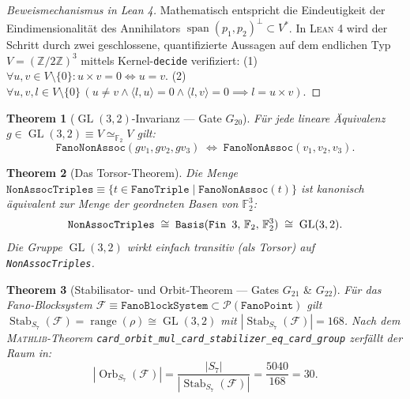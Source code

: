 \documentclass[11pt,a4paper]{article}
\newtheorem{theorem}{Theorem}[section]
\theoremstyle{remark}
\begin{document}
	\begin{proof}[Beweismechanismus in Lean 4]
		Mathematisch entspricht die Eindeutigkeit der Eindimensionalität des Annihilators $\operatorname{span}(p_1, p_2)^\perp \subset V^*$. In \textsc{Lean 4} wird der Schritt durch zwei geschlossene, quantifizierte Aussagen auf dem endlichen Typ $V = (\mathbb{Z}/2\mathbb{Z})^3$ mittels Kernel-\texttt{decide} verifiziert:
		(1) $\forall u, v \in V \setminus \{0\}: u \times v = 0 \iff u = v$.
		(2) $\forall u, v, l \in V \setminus \{0\} \, (u \neq v \land \langle l, u \rangle = 0 \land \langle l, v \rangle = 0 \implies l = u \times v)$.
	\end{proof}
	
	\begin{theorem}[$\operatorname{GL}(3,2)$-Invarianz --- Gate $G_{20}$]
		Für jede lineare Äquivalenz $g \in \operatorname{GL}(3,2) \equiv V \simeq_{\mathbb{F}_2} V$ gilt:
		\begin{equation}
			\texttt{FanoNonAssoc}(g v_1, g v_2, g v_3) \;\Longleftrightarrow\; \texttt{FanoNonAssoc}(v_1, v_2, v_3).
		\end{equation}
	\end{theorem}
	
	\begin{theorem}[Das Torsor-Theorem]
		Die Menge $\texttt{NonAssocTriples} \equiv \{t \in \texttt{FanoTriple} \mid \texttt{FanoNonAssoc}(t)\}$ ist kanonisch äquivalent zur Menge der geordneten Basen von $\mathbb{F}_2^3$:
		\begin{equation}
			\texttt{NonAssocTriples} \;\cong\; \text{\texttt{Basis}}(\text{\texttt{Fin }} 3, \, \mathbb{F}_2, \, \mathbb{F}_2^3) \;\cong\; \operatorname{GL}(3,2).
		\end{equation}
		Die Gruppe $\operatorname{GL}(3,2)$ wirkt einfach transitiv (als Torsor) auf \texttt{NonAssocTriples}.
	\end{theorem}
	
	\begin{theorem}[Stabilisator- und Orbit-Theorem --- Gates $G_{21}$ \& $G_{22}$]
		Für das Fano-Blocksystem $\mathcal{F} \equiv \texttt{FanoBlockSystem} \subset \mathcal{P}(\texttt{FanoPoint})$ gilt $\operatorname{Stab}_{S_7}(\mathcal{F}) = \operatorname{range}(\rho) \cong \operatorname{GL}(3,2)$ mit $|\operatorname{Stab}_{S_7}(\mathcal{F})| = 168$. Nach dem \textsc{Mathlib}-Theorem \texttt{card\_orbit\_mul\_card\_stabilizer\_eq\_card\_group} zerfällt der Raum in:
		\begin{equation}
			|\operatorname{Orb}_{S_7}(\mathcal{F})| = \frac{|S_7|}{|\operatorname{Stab}_{S_7}(\mathcal{F})|} = \frac{5040}{168} = 30.
		\end{equation}
	\end{theorem}
	
\end{document}
